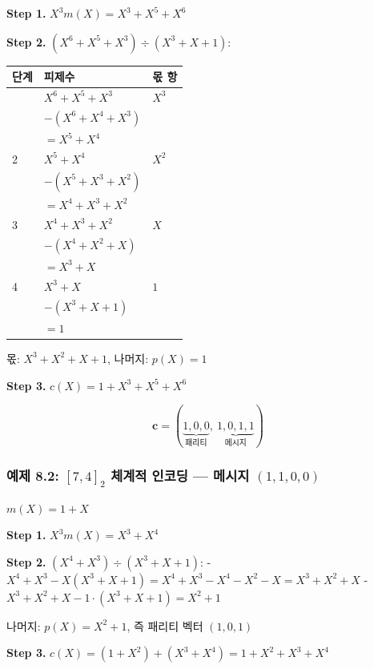 \documentclass[
  oneside]{article}
\begin{document}
\textbf{Step 1.} \(X^3 m(X) = X^3 + X^5 + X^6\)

\textbf{Step 2.} \((X^6 + X^5 + X^3) \div (X^3 + X + 1)\):

\begin{longtable}[]{@{}lll@{}}
\toprule\noalign{}
단계 & 피제수 & 몫 항 \\
\midrule\noalign{}
\endhead
\bottomrule\noalign{}
\endlastfoot
1 & \(X^6 + X^5 + X^3\) & \(X^3\) \\
& \(-(X^6 + X^4 + X^3)\) & \\
& \(= X^5 + X^4\) & \\
2 & \(X^5 + X^4\) & \(X^2\) \\
& \(-(X^5 + X^3 + X^2)\) & \\
& \(= X^4 + X^3 + X^2\) & \\
3 & \(X^4 + X^3 + X^2\) & \(X\) \\
& \(-(X^4 + X^2 + X)\) & \\
& \(= X^3 + X\) & \\
4 & \(X^3 + X\) & \(1\) \\
& \(-(X^3 + X + 1)\) & \\
& \(= 1\) & \\
\end{longtable}

몫: \(X^3 + X^2 + X + 1\), 나머지: \(p(X) = 1\)

\textbf{Step 3.} \(c(X) = 1 + X^3 + X^5 + X^6\)

\[\mathbf{c} = (\underbrace{1, 0, 0}_{\text{패리티}},\ \underbrace{1, 0, 1, 1}_{\text{메시지}})\]

\subsubsection{\texorpdfstring{예제 8.2: \([7, 4]_2\) 체계적 인코딩 ---
메시지
\((1, 1, 0, 0)\)}{예제 8.2: {[}7, 4{]}\_2 체계적 인코딩 --- 메시지 (1, 1, 0, 0)}}\label{uxc608uxc81c-8.2-7-4_2-uxccb4uxacc4uxc801-uxc778uxcf54uxb529-uxba54uxc2dcuxc9c0-1-1-0-0}

\(m(X) = 1 + X\)

\textbf{Step 1.} \(X^3 m(X) = X^3 + X^4\)

\textbf{Step 2.} \((X^4 + X^3) \div (X^3 + X + 1)\): -
\(X^4 + X^3 - X(X^3 + X + 1) = X^4 + X^3 - X^4 - X^2 - X = X^3 + X^2 + X\)
- \(X^3 + X^2 + X - 1 \cdot (X^3 + X + 1) = X^2 + 1\)

나머지: \(p(X) = X^2 + 1\), 즉 패리티 벡터 \((1, 0, 1)\)

\textbf{Step 3.}
\(c(X) = (1 + X^2) + (X^3 + X^4) = 1 + X^2 + X^3 + X^4\)
\end{document}
